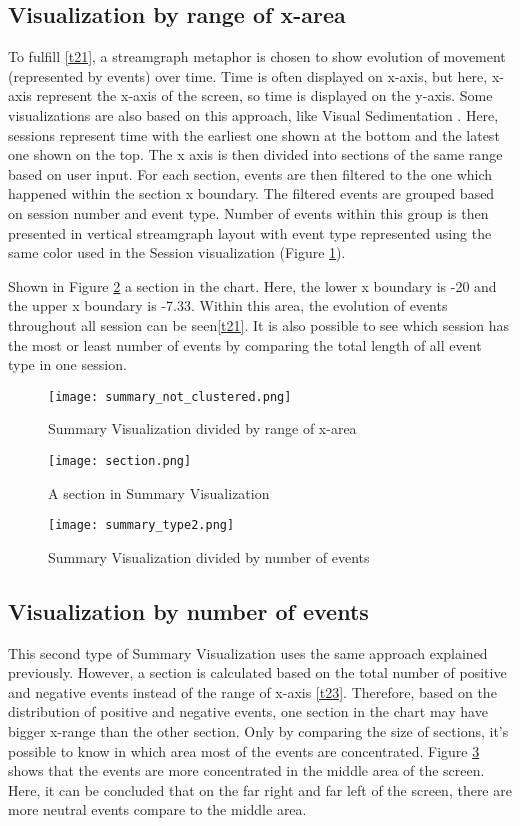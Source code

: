 \subsection{Visualization by range of x-area}
To fulfill \ref{t21}, a streamgraph metaphor is chosen to show evolution of movement (represented by events) over time. 
Time is often displayed on x-axis, but here, x-axis represent the x-axis of the screen, so time is displayed on the y-axis. Some visualizations are also based on this approach, like Visual Sedimentation \cite{huron}. Here, sessions represent time with the earliest one shown at the bottom and the latest one shown on the top. The x axis is then divided into sections of the same range based on user input. For each section, events are then filtered to the one which happened within the section x boundary. The filtered events are grouped based on session number and event type. Number of events within this group is then presented in vertical streamgraph layout with event type represented using the same color used in the Session visualization (Figure  \ref{fig:type1_not_clustered}). 

Shown in Figure \ref{fig:type1_section} a section in the chart. Here, the lower x boundary is -20 and the upper x boundary is -7.33. Within this area, the evolution of events throughout all session can be seen\ref{t21}. It is also possible to see which session has the most or least number of events by comparing the total length of all event type in one session. 

\begin{figure}
\centering
\texttt{[image: summary\_not\_clustered.png]}
\caption{Summary Visualization divided by range of x-area}
\label{fig:type1_not_clustered}
\end{figure}

\begin{figure}
\centering
\texttt{[image: section.png]}
\caption{A section in Summary Visualization}
\label{fig:type1_section}
\end{figure}

\begin{figure}
\centering
\texttt{[image: summary\_type2.png]}
\caption{Summary Visualization divided by number of events}
\label{fig:type2}
\end{figure}

\subsection{Visualization by number of events}
This second type of Summary Visualization uses the same approach explained previously. However, a section is calculated based on the total number of positive and negative events instead of the range of x-axis \ref{t23}. Therefore, based on the distribution of positive and negative events, one section in the chart may have bigger x-range than the other section. Only by comparing the size of sections, it's possible to know in which area most of the events are concentrated. Figure \ref{fig:type2} shows that the events are more concentrated in the middle area of the screen. Here, it can be concluded that on the far right and far left of the screen, there are more neutral events compare to the middle area.

